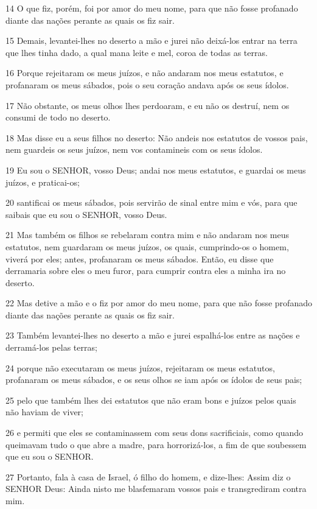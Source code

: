 \par 14 O que fiz, porém, foi por amor do meu nome, para que não fosse profanado diante das nações perante as quais os fiz sair.
\par 15 Demais, levantei-lhes no deserto a mão e jurei não deixá-los entrar na terra que lhes tinha dado, a qual mana leite e mel, coroa de todas as terras.
\par 16 Porque rejeitaram os meus juízos, e não andaram nos meus estatutos, e profanaram os meus sábados, pois o seu coração andava após os seus ídolos.
\par 17 Não obstante, os meus olhos lhes perdoaram, e eu não os destruí, nem os consumi de todo no deserto.
\par 18 Mas disse eu a seus filhos no deserto: Não andeis nos estatutos de vossos pais, nem guardeis os seus juízos, nem vos contamineis com os seus ídolos.
\par 19 Eu sou o SENHOR, vosso Deus; andai nos meus estatutos, e guardai os meus juízos, e praticai-os;
\par 20 santificai os meus sábados, pois servirão de sinal entre mim e vós, para que saibais que eu sou o SENHOR, vosso Deus.
\par 21 Mas também os filhos se rebelaram contra mim e não andaram nos meus estatutos, nem guardaram os meus juízos, os quais, cumprindo-os o homem, viverá por eles; antes, profanaram os meus sábados. Então, eu disse que derramaria sobre eles o meu furor, para cumprir contra eles a minha ira no deserto.
\par 22 Mas detive a mão e o fiz por amor do meu nome, para que não fosse profanado diante das nações perante as quais os fiz sair.
\par 23 Também levantei-lhes no deserto a mão e jurei espalhá-los entre as nações e derramá-los pelas terras;
\par 24 porque não executaram os meus juízos, rejeitaram os meus estatutos, profanaram os meus sábados, e os seus olhos se iam após os ídolos de seus pais;
\par 25 pelo que também lhes dei estatutos que não eram bons e juízos pelos quais não haviam de viver;
\par 26 e permiti que eles se contaminassem com seus dons sacrificiais, como quando queimavam tudo o que abre a madre, para horrorizá-los, a fim de que soubessem que eu sou o SENHOR.
\par 27 Portanto, fala à casa de Israel, ó filho do homem, e dize-lhes: Assim diz o SENHOR Deus: Ainda nisto me blasfemaram vossos pais e transgrediram contra mim.
